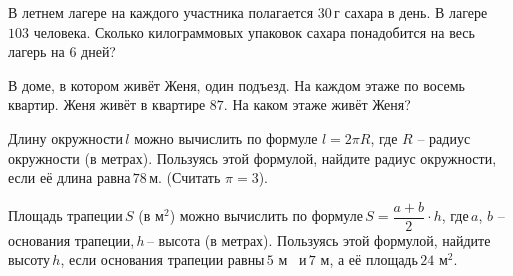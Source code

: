 %
%
\begin{class}[number=3]
	\begin{listofex}
		\item 	
		\begin{enumcols}[itemcolumns=1]
			\item {}
			\item {}
			\item {}
			\item {}
			\item {}
			\item {}
			\item {}
			\item {}
			\item {}
		\end{enumcols}
		\item В летнем лагере на каждого участника полагается \( 30 \) г сахара в день. В лагере \( 103 \) человека. Сколько килограммовых упаковок сахара понадобится на весь лагерь на \( 6 \) дней?
		\item В доме, в котором живёт Женя, один подъезд. На каждом этаже по восемь квартир. Женя живёт в квартире \( 87 \). На каком этаже живёт Женя?
		\item Длину окружности \( l \) можно вычислить по формуле \( l=2\pi R \), где \( R \) -- радиус окружности (в метрах). Пользуясь этой формулой, найдите радиус окружности, если её длина равна \( 78 \) м. (Считать \( \pi=3 \)).
		\item Площадь трапеции \( S \) (в м\( ^2 \)) можно вычислить по формуле \( S=\dfrac{a+b}{2}\cdot h \),  где \( a\), \( b   \) -- основания трапеции, \( h \) -- высота (в метрах). Пользуясь этой формулой, найдите высоту \( h \), если основания трапеции равны \( 5 \) м   и \( 7 \) м, а её площадь \( 24 \) м\( ^2 \).
	\end{listofex}
\end{class}
%
%
%
